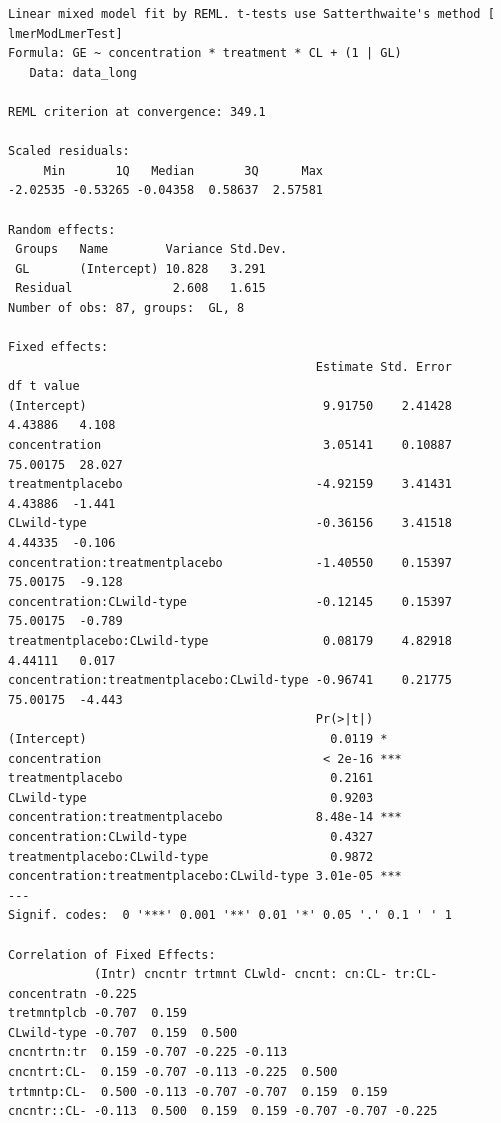 \documentclass[
  letterpaper,
  DIV=11,
  numbers=noendperiod]{scrartcl}
\begin{document}
\begin{verbatim}
Linear mixed model fit by REML. t-tests use Satterthwaite's method [
lmerModLmerTest]
Formula: GE ~ concentration * treatment * CL + (1 | GL)
   Data: data_long

REML criterion at convergence: 349.1

Scaled residuals: 
     Min       1Q   Median       3Q      Max 
-2.02535 -0.53265 -0.04358  0.58637  2.57581 

Random effects:
 Groups   Name        Variance Std.Dev.
 GL       (Intercept) 10.828   3.291   
 Residual              2.608   1.615   
Number of obs: 87, groups:  GL, 8

Fixed effects:
                                           Estimate Std. Error       df t value
(Intercept)                                 9.91750    2.41428  4.43886   4.108
concentration                               3.05141    0.10887 75.00175  28.027
treatmentplacebo                           -4.92159    3.41431  4.43886  -1.441
CLwild-type                                -0.36156    3.41518  4.44335  -0.106
concentration:treatmentplacebo             -1.40550    0.15397 75.00175  -9.128
concentration:CLwild-type                  -0.12145    0.15397 75.00175  -0.789
treatmentplacebo:CLwild-type                0.08179    4.82918  4.44111   0.017
concentration:treatmentplacebo:CLwild-type -0.96741    0.21775 75.00175  -4.443
                                           Pr(>|t|)    
(Intercept)                                  0.0119 *  
concentration                               < 2e-16 ***
treatmentplacebo                             0.2161    
CLwild-type                                  0.9203    
concentration:treatmentplacebo             8.48e-14 ***
concentration:CLwild-type                    0.4327    
treatmentplacebo:CLwild-type                 0.9872    
concentration:treatmentplacebo:CLwild-type 3.01e-05 ***
---
Signif. codes:  0 '***' 0.001 '**' 0.01 '*' 0.05 '.' 0.1 ' ' 1

Correlation of Fixed Effects:
            (Intr) cncntr trtmnt CLwld- cncnt: cn:CL- tr:CL-
concentratn -0.225                                          
tretmntplcb -0.707  0.159                                   
CLwild-type -0.707  0.159  0.500                            
cncntrtn:tr  0.159 -0.707 -0.225 -0.113                     
cncntrt:CL-  0.159 -0.707 -0.113 -0.225  0.500              
trtmntp:CL-  0.500 -0.113 -0.707 -0.707  0.159  0.159       
cncntr::CL- -0.113  0.500  0.159  0.159 -0.707 -0.707 -0.225
\end{verbatim}
\end{document}
